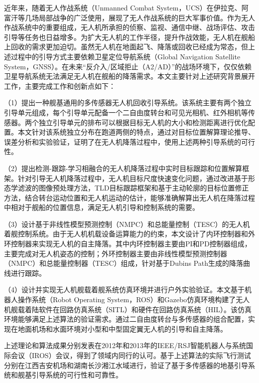 \begin{cabstract}
近年来，随着无人作战系统（Unmanned Combat System，UCS）在伊拉克、阿富汗等几场局部战争的广泛使用，展现了无人作战系统的巨大军事价值。作为无人作战系统中的重要组成，无人机所承担的侦察、监视、通信中继、战场评估、攻击引导等任务也日益增多。为扩大无人机的工作半径，提升作战效能，无人机在舰船上回收的需求更加迫切。虽然无人机在地面起飞、降落或回收已经成为常态，但上述过程中的引导方式主要依赖卫星定位导航系统（Global Navigation Satellite System，GNSS）。在未来“反介入/区域拒止（A2/AD）”的战场环境下，仅仅依赖卫星导航系统无法满足无人机在舰船的降落需求。本文主要针对上述研究背景展开工作，主要完成工作和创新点如下：

（1）提出一种舰基通用的多传感器无人机回收引导系统。该系统主要有两个独立引导单元组成，每个引导单元配备一个二自由度转台和可见光相机、红外相机等传感器。两个独立引导单元的排布可以根据目标无人机的大小和检测距离进行优化配置。本文针对该系统独立分布在跑道两侧的特点，通过对目标位置解算理论推导、误差分析和实验验证，证明了在无人机降落过程中，使用上述两种引导系统的可行性。

（2）提出检测-跟踪-学习相融合的无人机降落过程中实时目标跟踪和位置解算框架。针对引导无人机降落过程中，无人机目标尺度快速变化问题，通过改进基于形态学滤波的图像预处理方法，TLD目标跟踪框架和基于主动轮廓的目标位置修正方法，结合转台运动位置和无人机运动的估计，能够准确解算出无人机在降落过程中相对于舰船的位置信息，满足无人机引导和控制系统的需要。

（3）设计基于非线性模型预测控制（NMPC）和总能量控制（TESC）的无人机着舰控制系统。由于无人机机载设备运算能力的约束，本文设计了内环控制器和外环控制器来实现无人机的自主降落。其中内环控制器主要由PI和PD控制器组成，主要完成对无人机姿态的控制；外环控制器主要由非线性模型预测控制器（NMPC）和总能量控制器（TESC）组成，针对基于Dubins Path生成的降落曲线进行跟踪。

（4）设计并实现无人机舰载着舰系统仿真环境并进行户外实验验证。本文基于机器人操作系统（Robot Operating System，ROS）和Gazebo仿真环境构建了无人机舰载着陆软件在回路仿真系统（SITL）和硬件在回路仿真系统（HIL）。该仿真环境能够满足上述算法的验证需求。通过二自由度转台与多传感器的组合配置，实现在地面机场和水面环境对小型和中型固定翼无人机的引导和自主降落。

上述理论和算法成果分别发表在2012年和2013年的IEEE/RSJ智能机器人与系统国际会议（IROS）会议，得到了领域内同行的认可。基于上述算法的实际飞行测试分别在江西吉安机场和湖南长沙湘江水域进行，验证了基于多传感器的地基引导系统和舰基引导系统的可行性和可靠性。

\end{cabstract}

